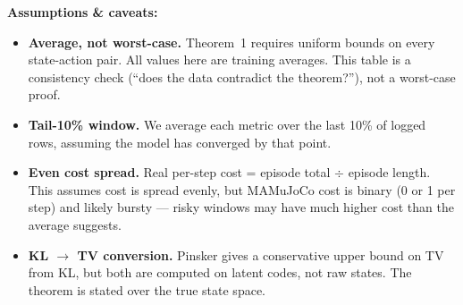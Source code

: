 \documentclass[10pt]{article}
\begin{document}
\vspace{0.8em}
\noindent\textbf{Assumptions \& caveats:}
\begin{itemize}\setlength\itemsep{0.3em}
  \item \textbf{Average, not worst-case.}
        Theorem~1 requires uniform bounds on every state-action pair.
        All values here are training averages.
        This table is a consistency check (``does the data contradict the theorem?''),
        not a worst-case proof.
  \item \textbf{Tail-10\% window.}
        We average each metric over the last 10\% of logged rows,
        assuming the model has converged by that point.
  \item \textbf{Even cost spread.}
        Real per-step cost = episode total $\div$ episode length.
        This assumes cost is spread evenly, but MAMuJoCo cost is binary (0 or 1 per step)
        and likely bursty --- risky windows may have much higher cost than the average suggests.
  \item \textbf{KL $\to$ TV conversion.}
        Pinsker gives a conservative upper bound on TV from KL,
        but both are computed on latent codes, not raw states.
        The theorem is stated over the true state space.
\end{itemize}
\end{document}
